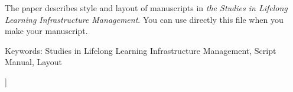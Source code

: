 \documentclass[b5paper,10pt,twocolumn,tombow]{jarticle}
\begin{document}
\begin{center}
\begin{eauthors}
 
\end{eauthors}
\begin{eaffiliation}
\end{eaffiliation}
 \begin{eabstract}
The paper describes style and layout of manuscripts in \textit{the Studies in
  Lifelong Learning Infrastructure Management}. You can use
  directly this
  file when you make your manuscript.
 \end{eabstract}
\begin{keyword}
Keywords: Studies in Lifelong Learning Infrastructure Management, Script Manual, Layout
\end{keyword}
\end{center}
]
\end{document}

